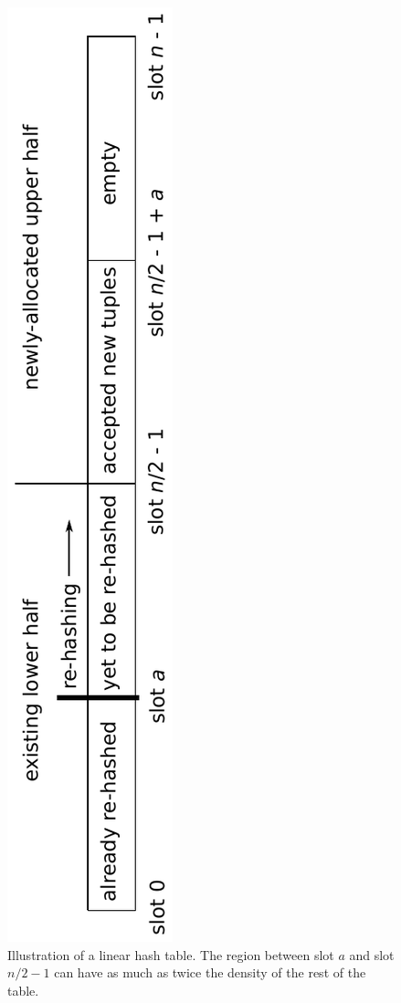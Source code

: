 \documentclass{sig-alternate}
\renewcommand\:{\colon} %
\begin{document}
\begin{figure}[t]

\includegraphics[scale=0.47, angle = -90]{Rehashing.pdf}
\caption{Illustration of a linear hash table.  The region between slot $a$ and slot $n/2 - 1$ can have as much as
twice the density of the rest of the table.}

\end{figure}
\end{document}
